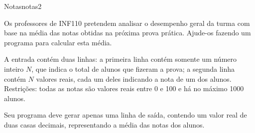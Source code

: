 \documentclass[12pt,a4paper,oneside]{article}
\begin{document}
\begin{problem}{Notas}{notas}{2}
 
Os professores de INF110 pretendem analisar o desempenho geral da turma com base na média das notas obtidas na próxima prova prática. Ajude-os fazendo um programa para calcular esta média.

%

\InputFile

A entrada contém duas linhas: a primeira linha contém somente um número inteiro $N$, que indica o total de alunos que fizeram a prova; a segunda linha contém $N$ valores reais, cada um deles indicando a nota de um dos alunos. Restrições: todas as notas são valores reais entre 0 e 100 e há no máximo 1000 alunos.


\OutputFile

Seu programa deve gerar apenas uma linha de saída, contendo um valor real de duas casas decimais, representando a média das notas dos alunos.

\Example

\begin{example}
%
\end{example}

\begin{example}
%
\end{example}



\end{problem}
\end{document}
